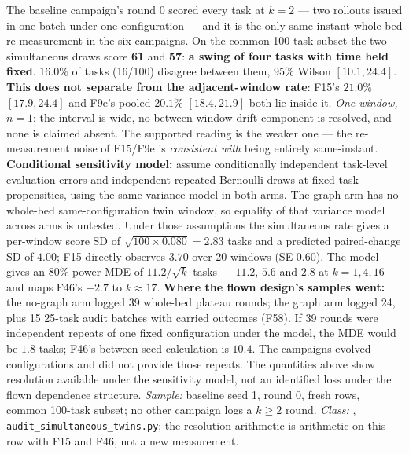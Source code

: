 \begin{description}[leftmargin=0pt,labelindent=0pt,labelsep=0pt,style=nextline,font=\normalfont,itemsep=6pt]
\item[\textbf{F70}\quad Same-instant re-measurement, and what this design
      can resolve.]
The baseline campaign's round 0 scored every task at $k{=}2$ --- two
rollouts issued in one batch under one configuration --- and it is the only
same-instant whole-bed re-measurement in the six campaigns. On the common
100-task subset the two simultaneous draws score \textbf{61} and
\textbf{57}: \textbf{a swing of four tasks with time held fixed}.
\textbf{$16.0\%$} of tasks (16/100) disagree between them, 95\% Wilson
$[10.1, 24.4]$. \textbf{This does not separate from the adjacent-window
rate}: F15's $21.0\%$ $[17.9, 24.4]$ and F9e's pooled $20.1\%$ $[18.4,
21.9]$ both lie inside it. \emph{One window, $n=1$}: the interval is wide,
no between-window drift component is resolved, and none is claimed absent.
The supported reading is the weaker one --- the re-measurement noise of
F15/F9e is \emph{consistent with} being entirely same-instant.
\textbf{Conditional sensitivity model:} assume conditionally independent
task-level evaluation errors and independent repeated Bernoulli draws at fixed
task propensities, using the same variance model in both arms. The graph arm
has no whole-bed same-configuration twin window, so equality of that variance
model across arms is untested. Under those assumptions the simultaneous rate gives a per-window score SD of
$\sqrt{100\times0.080}=2.83$ tasks and a predicted paired-change SD of
$4.00$; F15 directly observes $3.70$ over 20 windows (SE $0.60$).
The model gives an 80\%-power MDE of $11.2/\sqrt{k}$ tasks --- $11.2$,
$5.6$ and $2.8$ at $k=1,4,16$ --- and maps F46's $+2.7$ to $k\approx17$.
\textbf{Where the flown design's samples went:} the no-graph arm logged 39
whole-bed plateau rounds; the graph arm logged 24, plus 15 25-task audit
batches with carried outcomes (F58). If 39 rounds were independent repeats of
one fixed configuration under the model, the MDE would be $1.8$ tasks; F46's
between-seed calculation is $10.4$. The campaigns evolved configurations and
did not provide those repeats. The quantities above show resolution available
under the sensitivity model, not an identified loss under the flown dependence
structure.
\emph{Sample:} baseline seed 1, round 0, fresh rows, common 100-task
subset; no other campaign logs a $k \ge 2$ round. \emph{Class:} ,
\texttt{audit\_simultaneous\_twins.py}; the resolution arithmetic is
arithmetic on this row with F15 and F46, not a new measurement.


\end{description}
